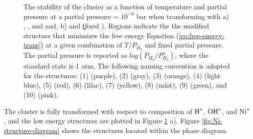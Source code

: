 \documentclass[journal=jctcce,manuscript=article]{achemso}
\begin{document}
\begin{figure}[H]
{    The stability of the  cluster as a function of temperature and  partial pressure at a  partial pressure = $10^{-9}$ bar when transforming with a)
    , , and  and, b)  and \c (fixed ). Regions indicate the the modified structure that minimizes the free energy Equation (\ref{eq:free-energy-trans}) at a given combination of $T/P_{H_{2}}$ and fixed  partial pressure. The  partial pressure is reported as $log(P_{H_{2}}/P_{H_{2}}^{o})$, where the standard state is 1 atm. The following naming convention is adopted for the structures: 
    (1)  (purple),              %
    (2)  (gray),            %
    (3)  (orange),         %
    (4)  (light blue),          %
    (5)  (red),                 %
    (6)  (lilac),                 %
    (7)  (yellow),         %
    (8)  (mint),           %
    (9)   (green),       %
    and  
    (10)  (pink).    %
    }
    \label{fig:phase_diagram_Ni_combined}
\end{figure}   

The cluster is fully transformed with respect to composition of $\ce{H^{*}}$, $\ce{OH^{*}}$, and $\ce{Ni^{*}}$, and the low energy structures are plotted in Figure \ref{fig:phase_diagram_Ni_combined} a). Figure \ref{fig:Ni-structure-diagram} shows the structures located within the phase diagram. 
\end{document}
